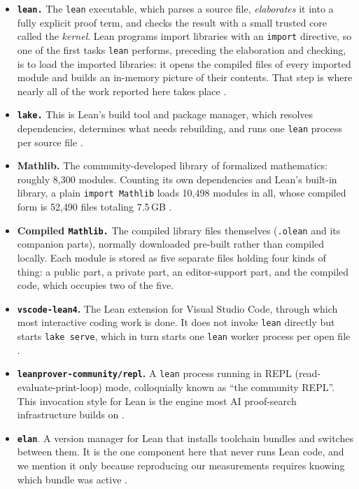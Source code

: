\documentclass{article}
\newcommand{\Lean}{Lean\xspace}      %
\newcommand{\lean}{\texttt{lean}\xspace}      %
\newcommand{\mathlib}{Mathlib\xspace}
\begin{document}
\begin{itemize}
\item \textbf{\texttt{lean.}} The \lean executable, which parses a source file, \emph{elaborates} it into a fully explicit proof term, and checks the result with a small trusted core called the \emph{kernel}. \Lean programs import libraries with an \texttt{import} directive, so one of the first tasks \lean performs, preceding the elaboration and checking, is to load the imported libraries: it opens the compiled files of every imported module and builds an in-memory picture of their contents. That step is where nearly all of the work reported here takes place \cite{lean4}.
\item \textbf{\texttt{lake.}} This is \Lean's build tool and package manager, which resolves dependencies, determines what needs rebuilding, and runs one \lean process per source file \cite{lean4}.
\item \textbf{\mathlib.} The community-developed library of formalized mathematics: roughly 8{,}300 modules. Counting its own dependencies and \Lean's built-in library, a plain \texttt{import Mathlib} loads 10{,}498 modules in all, whose compiled form is 52{,}490 files totaling 7.5\,GB \cite{mathlib}.
\item \textbf{Compiled \texttt{Mathlib.}} The compiled library files themselves (\texttt{.olean} and its companion parts), normally downloaded pre-built rather than compiled locally. Each module is stored as five separate files holding four kinds of thing: a public part, a private part, an editor-support part, and the compiled code, which occupies two of the five.
\item \textbf{\texttt{vscode-lean4}.} The \Lean extension for Visual Studio Code, through which most interactive coding work is done. It does not invoke \texttt{lean} directly but starts \texttt{lake serve}, which in turn starts one \texttt{lean} worker process per open file \cite{vscode-lean4}.
\item \textbf{\texttt{leanprover-community/repl}.} A \texttt{lean} process running in REPL (read-evaluate-print-loop) mode, colloquially known as ``the community REPL''. This invocation style for \Lean is the engine most AI proof-search infrastructure builds on \cite{aristotle,repl,lean-at-scale}.
\item \textbf{\texttt{elan}}. A version manager for \Lean that installs toolchain bundles and switches between them. It is the one component here that never runs \Lean code, and we mention it only because reproducing our measurements requires knowing which bundle was active \cite{elan}.
\end{itemize}
\end{document}
